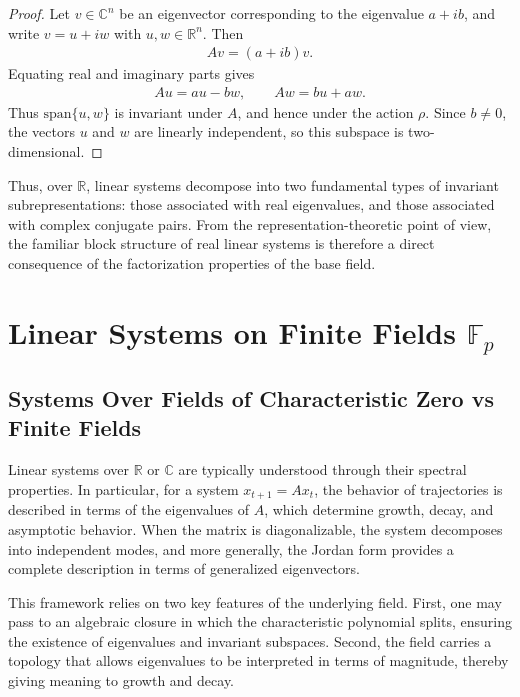 \documentclass[letterpaper, 9pt, conference]{ieeeconf}
\begin{document}
\begin{proof}
Let $v \in \mathbb{C}^n$ be an eigenvector corresponding to the eigenvalue
$a+ib$, and write $v = u + iw$ with $u,w \in \mathbb{R}^n$. Then
\begin{eqnarray}
Av = (a+ib)v.
\end{eqnarray}
Equating real and imaginary parts gives
\begin{eqnarray}
Au = au - bw, \qquad Aw = bu + aw.
\end{eqnarray}
Thus $\mathrm{span}\{u,w\}$ is invariant under $A$, and hence under the action
$\rho$. Since $b \neq 0$, the vectors $u$ and $w$ are linearly independent, so
this subspace is two-dimensional.
\end{proof}

Thus, over $\mathbb{R}$, linear systems decompose into two fundamental types of
invariant subrepresentations: those associated with real eigenvalues, and those
associated with complex conjugate pairs. From the representation-theoretic point
of view, the familiar block structure of real linear systems is therefore a
direct consequence of the factorization properties of the base field.




\section{Linear Systems on Finite Fields $\mathbb{F}_p$}\label{sec_finite_fields}

\subsection{Systems Over Fields of Characteristic Zero vs Finite Fields}

Linear systems over $\mathbb{R}$ or $\mathbb{C}$ are typically understood
through their spectral properties. In particular, for a system
$x_{t+1} = A x_t$, the behavior of trajectories is described in terms of the
eigenvalues of $A$, which determine growth, decay, and asymptotic behavior.
When the matrix is diagonalizable, the system decomposes into independent modes,
and more generally, the Jordan form provides a complete description in terms of
generalized eigenvectors.

This framework relies on two key features of the underlying field. First, one
may pass to an algebraic closure in which the characteristic polynomial splits,
ensuring the existence of eigenvalues and invariant subspaces. Second, the field
carries a topology that allows eigenvalues to be interpreted in terms of
magnitude, thereby giving meaning to growth and decay.
\end{document}
